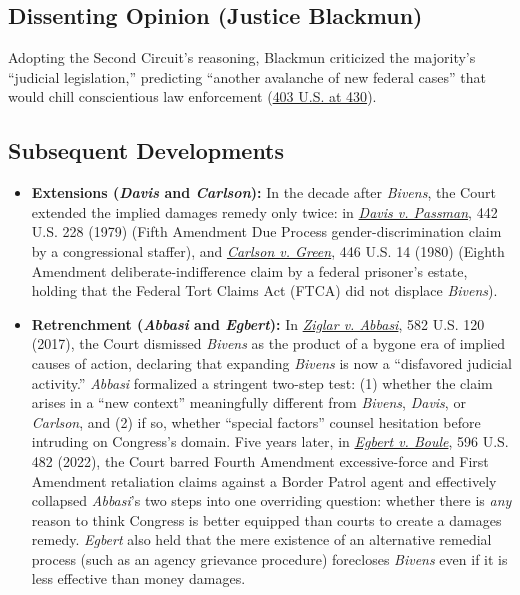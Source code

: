 \documentclass[12pt]{article}
\begin{document}
\subsection{Dissenting Opinion (Justice Blackmun)}

Adopting the Second Circuit's reasoning, Blackmun criticized the majority's ``judicial legislation,'' predicting ``another avalanche of new federal cases'' that would chill conscientious law enforcement (\href{https://www.law.cornell.edu/supremecourt/text/403/388}{403 U.S. at 430}).

\subsection{Subsequent Developments}

\begin{itemize}

\item \textbf{Extensions (\textit{Davis} and \textit{Carlson}):} In the decade after \textit{Bivens}, the Court extended the implied damages remedy only twice: in \href{https://supreme.justia.com/cases/federal/us/442/228/}{\textit{Davis v. Passman}}, 442 U.S. 228 (1979) (Fifth Amendment Due Process gender-discrimination claim by a congressional staffer), and \href{https://supreme.justia.com/cases/federal/us/446/14/}{\textit{Carlson v. Green}}, 446 U.S. 14 (1980) (Eighth Amendment deliberate-indifference claim by a federal prisoner's estate, holding that the Federal Tort Claims Act (FTCA) did not displace \textit{Bivens}).

\item \textbf{Retrenchment (\textit{Abbasi} and \textit{Egbert}):} In \href{https://supreme.justia.com/cases/federal/us/582/15-1358/}{\textit{Ziglar v. Abbasi}}, 582 U.S. 120 (2017), the Court dismissed \textit{Bivens} as the product of a bygone era of implied causes of action, declaring that expanding \textit{Bivens} is now a ``disfavored judicial activity.'' \textit{Abbasi} formalized a stringent two-step test: (1) whether the claim arises in a ``new context'' meaningfully different from \textit{Bivens}, \textit{Davis}, or \textit{Carlson}, and (2) if so, whether ``special factors'' counsel hesitation before intruding on Congress's domain. Five years later, in \href{https://supreme.justia.com/cases/federal/us/596/21-147/}{\textit{Egbert v. Boule}}, 596 U.S. 482 (2022), the Court barred Fourth Amendment excessive-force and First Amendment retaliation claims against a Border Patrol agent and effectively collapsed \textit{Abbasi}'s two steps into one overriding question: whether there is \textit{any} reason to think Congress is better equipped than courts to create a damages remedy. \textit{Egbert} also held that the mere existence of an alternative remedial process (such as an agency grievance procedure) forecloses \textit{Bivens} even if it is less effective than money damages.


\end{itemize}
\end{document}
